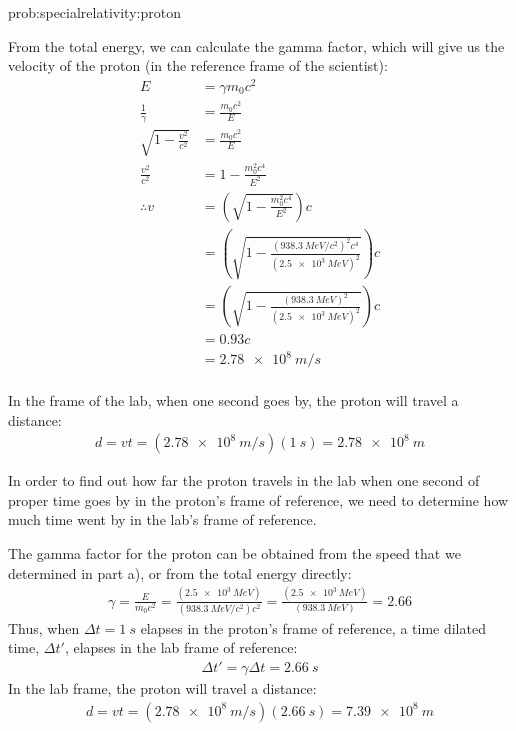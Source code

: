 \begin{solutionParts}{prob:specialrelativity:proton}
{\label{soln:specialrelativity:proton}
\item From the total energy, we can calculate the gamma factor, which will give us the velocity of the proton (in the reference frame of the scientist):
\begin{align*}
E &= \gamma m_0 c^2\\
\frac{1}{\gamma} &= \frac{m_0c^2}{E}\\
\sqrt{1-\frac{v^2}{c^2}} &= \frac{m_0c^2}{E}\\
\frac{v^2}{c^2} &= 1 - \frac{m_0^2c^4}{E^2}\\	
\therefore v &= \left(\sqrt{1-\frac{m_0^2c^4}{E^2}}\right) c\\
&= \left(\sqrt{1-\frac{(\SI{938.3}{MeV/c^2})^2c^4}{(\SI{2.5e3}{MeV})^2}}\right)c\\
&= \left(\sqrt{1-\frac{(\SI{938.3}{MeV})^2}{(\SI{2.5e3}{MeV})^2}}\right)c\\
&= 0.93c\\ 
&= \SI{2.78e8}{m/s}\\
\end{align*}
\item In the frame of the lab, when one second goes by, the proton will travel a distance:
\begin{align*}
d = vt = (\SI{2.78e8}{m/s})(\SI{1}{s})=\SI{2.78e8}{m}
\end{align*}
\item In order to find out how far the proton travels in the lab when one second of proper time goes by in the proton's frame of reference, we need to determine how much time went by in the lab's frame of reference. 

The gamma factor for the proton can be obtained from the speed that we determined in part a), or from the total energy directly:
\begin{align*}
\gamma = \frac{E}{m_0c^2}=\frac{(\SI{2.5e3}{MeV})}{(\SI{938.3}{MeV/c^2})c^2}=\frac{(\SI{2.5e3}{MeV})}{(\SI{938.3}{MeV})}=2.66
\end{align*}
Thus, when $\Delta t=\SI{1}{s}$ elapses in the proton's frame of reference, a time dilated time, $\Delta t'$, elapses in the lab frame of reference:
\begin{align*}
\Delta t' = \gamma \Delta t = \SI{2.66}{s}
\end{align*}
In the lab frame, the proton will travel a distance:
\begin{align*}
d = vt = (\SI{2.78e8}{m/s})(\SI{2.66}{s})=\SI{7.39e8}{m}
\end{align*}

}
\end{solutionParts}
